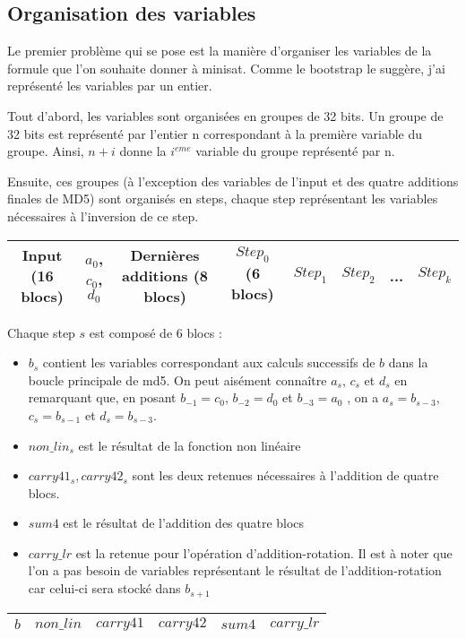 \documentclass{article}
\begin{document}
\subsection{Organisation des variables}
Le premier problème qui se pose est la manière d'organiser les variables de la formule que l'on souhaite donner à minisat. Comme le bootstrap le suggère, j'ai représenté les variables par un entier. 
\par
Tout d'abord, les variables sont organisées en groupes de 32 bits. Un groupe de 32 bits est représenté par l'entier n correspondant à la première variable du groupe. Ainsi, $n + i$ donne la $i^{eme}$ variable du groupe représenté par n. 
\par
Ensuite, ces groupes (à l'exception des variables de l'input et des quatre additions finales de MD5) sont organisés en steps, chaque step représentant les variables nécessaires à l'inversion de ce step.
\newline

\begin{tabular}{|c|c|c|c|c|c|c|c|}
   \hline
   Input (16 blocs) & $a_0$,$c_0$,$d_0$ & Dernières additions (8 blocs)& $Step_0$ (6 blocs) & $Step_1$ & $Step_2$ & ... & $Step_k$   \\
   \hline
\end{tabular}
\newline
\par
Chaque step $s$ est composé de 6 blocs : 
\begin{itemize}
\item $b_s$ contient les variables correspondant aux calculs successifs de $b$ dans la boucle principale de md5. On peut aisément connaître $a_s$, $c_s$ et $d_s$ en remarquant que, en posant $b_{-1} = c_0$, $b_{-2} = d_0$ et $b_{-3} = a_0$ , on a $a_s = b_{s-3}$, $c_s = b_{s-1}$ et  $d_s = b_{s-3}$.
\item $non\_lin_s$ est le résultat de la fonction non linéaire
\item $carry41_s, carry42_s$ sont les deux retenues nécessaires à l'addition de quatre blocs.
\item $sum4$ est le résultat de l'addition des quatre blocs
\item $carry\_lr$ est la retenue pour l'opération d'addition-rotation. Il est à noter que l'on a pas besoin de variables représentant le résultat de l'addition-rotation car celui-ci sera stocké dans $b_{s+1}$
\end{itemize}

\vspace{0.4cm}
\begin{tabular}{|c|c|c|c|c|c|}
   \hline
    $b$& $non\_lin$ & $carry41$ & $carry42$ & $sum4$ & $carry\_lr$ \\
   \hline
\end{tabular}
\end{document}
